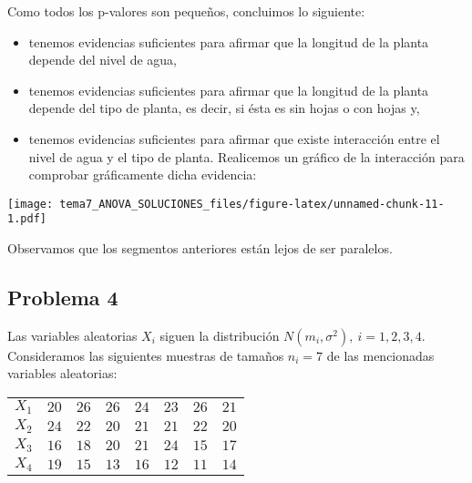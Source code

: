 \documentclass[
]{article}
\newenvironment{Shaded}{\begin{snugshade}}{\end{snugshade}}
\newcommand{\FunctionTok}[1]{\textcolor[rgb]{0.00,0.00,0.00}{#1}}
\newcommand{\NormalTok}[1]{#1}
\newcommand{\SpecialCharTok}[1]{\textcolor[rgb]{0.00,0.00,0.00}{#1}}
\providecommand{\tightlist}{%
  \setlength{\itemsep}{0pt}\setlength{\parskip}{0pt}}
\begin{document}
Como todos los p-valores son pequeños, concluimos lo siguiente:

\begin{itemize}
\tightlist
\item
  tenemos evidencias suficientes para afirmar que la longitud de la
  planta depende del nivel de agua,
\item
  tenemos evidencias suficientes para afirmar que la longitud de la
  planta depende del tipo de planta, es decir, si ésta es sin hojas o
  con hojas y,
\item
  tenemos evidencias suficientes para afirmar que existe interacción
  entre el nivel de agua y el tipo de planta. Realicemos un gráfico de
  la interacción para comprobar gráficamente dicha evidencia:
\end{itemize}

\begin{Shaded}
\end{Shaded}

\texttt{[image: tema7\_ANOVA\_SOLUCIONES\_files/figure-latex/unnamed-chunk-11-1.pdf]}

Observamos que los segmentos anteriores están lejos de ser paralelos.

\hypertarget{problema-4}{%
\subsection{Problema 4}\label{problema-4}}

Las variables aleatorias \(X_i\) siguen la distribución
\(N(m_i,\sigma^2),\ i=1,2,3,4\). Consideramos las siguientes muestras de
tamaños \(n_i=7\) de las mencionadas variables aleatorias: ~\newline

\begin{center}
\begin{tabular}{cccccccc}
$X_1$&$20$&$26$&$26$&$24$&$23$&$26$&$21$\\
$X_2$&$24$&$22$&$20$&$21$&$21$&$22$&$20$\\
$X_3$&$16$&$18$&$20$&$21$&$24$&$15$&$17$\\
$X_4$&$19$&$15$&$13$&$16$&$12$&$11$&$14$\\
\end{tabular}
\end{center}
\end{document}

